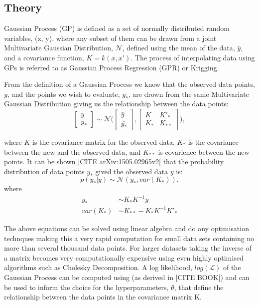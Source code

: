 \subsection{Theory}
Gaussian Process (GP) is defined as a set of normally distributed random variables, (x, y), where any subset of them can be drawn from a joint Multivariate Gaussian Distribution, $\mathcal{N}$, defined using the mean of the data, $\bar{y}$, and a covariance function, $K = k(x, x')$. The process of interpolating data using GPs is referred to as Gaussian Process Regression (GPR) or Krigging.

From the definition of a Gaussian Process we know that the observed data points, $y$, and the points we wish to evaluate, $y_*$, are drown from the same Multivariate Gaussian Distribution giving us the relationship between the data points:
\begin{equation}
\begin{bmatrix} y \\ y_* \end{bmatrix} \sim \mathcal{N}\Biggl(\begin{bmatrix} \bar{y} \\ \bar{y_*} \end{bmatrix},\begin{bmatrix} K & K'_*\\
 K_* & K_{**} \end{bmatrix}\Biggr),
\end{equation}

\noindent where $K$ is the covariance matrix for the observed data, $K_*$ is the covariance between the new and the observed data, and $K_{**}$ is covarience between the new points. It can be shown [CITE arXiv:1505.02965v2] that the probability distribution of data points $y_*$ gived the observed data $y$ is:
\begin{equation}
p(y_*|y) \sim \mathcal{N}(\bar{y_*},var(K_*)).
\end{equation}
\noindent where
\begin{align}
y_* &\sim K_*K^{-1}y \\
var(K_*) &\sim K_{**}-K_*K^{-1}K'_*
\end{align}

The above equations can be solved using linear algebra and do any optimisation technques making this a very rapid computation for small data sets containing no more than several thousand data points. For larger datasets taking the inverse of a matrix becomes very computationally expensive using even highly optimised algorithms such as Cholesky Decomposition. A log likelihood, $log(\mathcal{L})$ of the Gaussian Process can be computed using  (as derived in [CITE BOOK]) and can be used to inform the choice for the hyperparameters, $\theta$, that define the relationship between the data points in the covariance matrix K.

